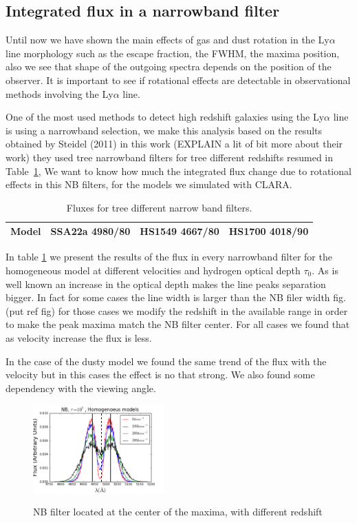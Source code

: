 \documentclass[usenatbib]{mn2e}
\begin{document}
\subsection{Integrated flux in a narrowband filter}

Until now we have shown the main effects of gas and dust rotation in
the Ly$\alpha$ line morphology such as the escape fraction, the FWHM,
the maxima position, also we see that shape of the outgoing spectra
depends on the position of the observer. It is important to see if
rotational effects are detectable in observational methods involving
the Ly$\alpha$ line.  

One of the most used methods to detect high redshift galaxies using
the Ly$\alpha$ line is using a narrowband selection, we make this
analysis based on the results obtained by Steidel (2011) in this work
(EXPLAIN a lit of bit more about their work) they used tree narrowband
filters for tree different redshifts resumed in
Table~\ref{table:NBfilters}, We want to know how much the integrated
flux change due to rotational effects in this NB filters, for the
models we simulated with CLARA. 

\begin{table}
\begin{center}
\begin{tabular}{cccc}\hline
Model & SSA22a 4980/80   & HS1549 4667/80 & HS1700 4018/90\\
\hline
\end{tabular}
\caption{
Fluxes for tree different narrow band filters.
} 
\label{table:NBfilters}
\end{center}
\end{table}

In table \ref{table:NBfilters} we present the results of the flux in
every  narrowband filter for the homogeneous model at different
velocities and hydrogen  optical depth $\tau_{0}$. As is well known an
increase in the optical depth makes  the line peaks separation
bigger. In fact for some cases the line width is larger  than the NB
filer width fig.(put ref fig) for those cases we modify the redshift
in the available range in order to make the peak maxima match the NB
filter center.  For all cases we found that as velocity increase the
flux is less.  

In the case of the dusty model we found the same trend of the flux
with the velocity  but in this cases the effect is no that strong.  We
also found some dependency with the viewing angle. 

\begin{figure}
  \includegraphics[width=0.45\textwidth]{NB7tDifVHOM.png}
 \label{figure:efvsNeufeld}\caption{NB filter located at the center of
   the maxima, with different redshift}  
\end{figure}
\end{document}
